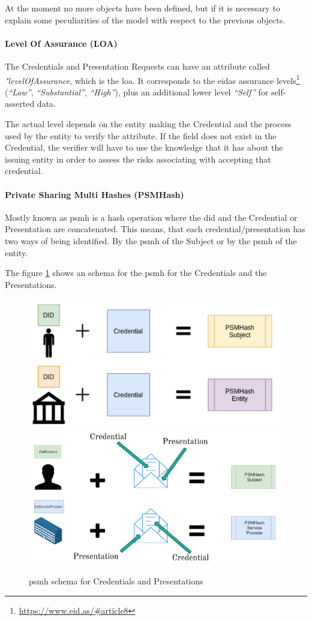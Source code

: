 \documentclass[a4paper, 12pt]{article} %
\begin{document}
            At the moment no more objects have been defined, but if it is necessary to explain some peculiarities of the model with respect to the previous objects.
            
            \paragraph{Level Of Assurance (LOA)}
                The Credentials and Presentation Requests can have an attribute called \textit{"levelOfAssurance}, which is the \acrfull{loa}. It corresponds to the \acrshort{eidas} assurance levels\footnote{\url{https://www.eid.as/\#article8}} (\textit{“Low”}, \textit{“Substantial”}, \textit{“High”}), plus an additional lower level \textit{“Self”} for self-asserted data. 
                
                The actual level depends on the entity making the Credential and the process used by the entity to verify the attribute. If the field does not exist in the Credential, the verifier will have to use the knowledge that it has about the issuing entity in order to assess the risks associating with accepting that credential.
                
            \paragraph{Private Sharing Multi Hashes (PSMHash)}
                Mostly known as \acrshort{psmh} is a hash operation where the \acrshort{did} and the Credential or Presentation are concatenated. This means, that each credential/presentation has two ways of being identified. By the \acrshort{psmh} of the Subject or by the \acrshort{psmh} of the entity.
                
                The figure \ref{fig:psmh} shows an schema for the \acrshort{psmh} for the Credentials and the Presentations.
                \begin{figure}[h]
                    \centering
                    \includegraphics[width=.5\textwidth]{psmhash-credential.png}\hfill
                    \includegraphics[width=.5\textwidth]{psmhash-presentation.png}
                    \caption{\acrshort{psmh} schema for Credentials and Presentations}
                    \label{fig:psmh}
                \end{figure}
                
\end{document}

